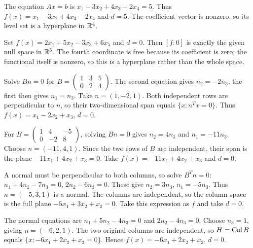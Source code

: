 The equation $Ax=b$ is $x_1-3x_2+4x_3-2x_4=5$.
Thus $f(x)=x_1-3x_2+4x_3-2x_4$ and $d=5$.
The coefficient vector is nonzero, so its level set is a hyperplane in $\mathbb{R}^4$.

Set $f(x)=2x_1+5x_2-3x_3+6x_5$ and $d=0$.
Then $[f:0]$ is exactly the given null space in $\mathbb{R}^5$.
The fourth coordinate is free because its coefficient is zero; the functional
itself is nonzero, so this is a hyperplane rather than the whole space.

Solve $Bn=0$ for $B=\left(\begin{smallmatrix}1&3&5\\0&2&4\end{smallmatrix}\right)$.
The second equation gives $n_2=-2n_3$, the first then gives $n_1=n_3$.
Take $n=(1,-2,1)$. Both independent rows are perpendicular to $n$, so
their two-dimensional span equals $\{x:n^Tx=0\}$.
Thus $f(x)=x_1-2x_2+x_3$, $d=0$.

For $B=\left(\begin{smallmatrix}1&4&-5\\0&-2&8\end{smallmatrix}\right)$,
solving $Bn=0$ gives $n_2=4n_3$ and $n_1=-11n_3$.
Choose $n=(-11,4,1)$. Since the two rows of $B$ are independent, their
span is the plane $-11x_1+4x_2+x_3=0$.
Take $f(x)=-11x_1+4x_2+x_3$ and $d=0$.

A normal must be perpendicular to both columns, so solve $B^Tn=0$:
$n_1+4n_2-7n_3=0$, $2n_2-6n_3=0$.
These give $n_2=3n_3$, $n_1=-5n_3$. Thus $n=(-5,3,1)$ is a normal.
The columns are independent, so the column space is the full plane
$-5x_1+3x_2+x_3=0$. Take this expression as $f$ and take $d=0$.

The normal equations are $n_1+5n_2-4n_3=0$ and $2n_2-4n_3=0$.
Choose $n_3=1$, giving $n=(-6,2,1)$.
The two original columns are independent, so $H=\operatorname{Col} B$ equals
$\{x:-6x_1+2x_2+x_3=0\}$. Hence $f(x)=-6x_1+2x_2+x_3$, $d=0$.

